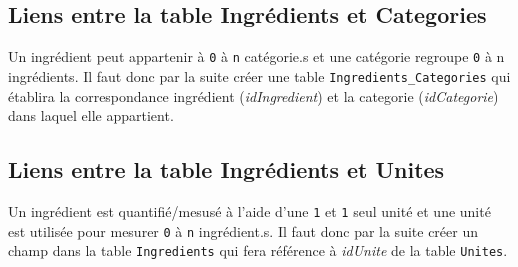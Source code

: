 \subsection{Liens entre la table Ingrédients et Categories}
Un ingrédient peut appartenir à \texttt{0} à \texttt{n} catégorie.s et une catégorie regroupe \texttt{0} à {n} ingrédients. Il faut donc par la suite créer une table \texttt{Ingredients\_Categories} qui établira la correspondance ingrédient (\textit{idIngredient}) et la categorie (\textit{idCategorie}) dans laquel elle appartient.

\subsection{Liens entre la table Ingrédients et Unites}
Un ingrédient est quantifié/mesusé à l'aide d'une \texttt{1} et \texttt{1} seul unité et une unité est utilisée pour mesurer \texttt{0} à \texttt{n} ingrédient.s. Il faut donc par la suite créer un champ dans la table \texttt{Ingredients} qui fera référence à \textit{idUnite} de la table \texttt{Unites}.

